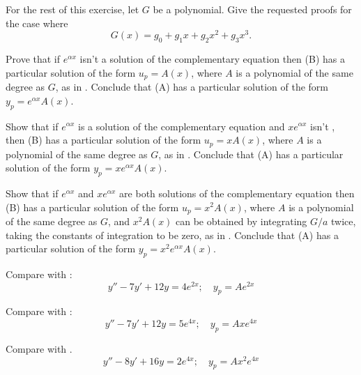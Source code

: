 \begin{exerciselist}
\begin{alist}
For the rest of this exercise, let $G$ be
 a polynomial. Give the requested proofs for the case where
\[
G(x)=g_0+g_1x+g_2x^2+g_3x^3.
\]

\item %
Prove that if $e^{\alpha x}$ isn't  a solution of the complementary
equation then (B) has a particular solution of the
form $u_p=A(x)$, where $A$ is a polynomial of the same degree as $G$,
as in . Conclude that (A) has
a particular solution of the form $y_p=e^{\alpha x}A(x)$.

\item %
Show that if $e^{\alpha x}$ is a solution of the complementary
equation and $xe^{\alpha x}$ isn't , then (B) has a
particular solution of the form $u_p=xA(x)$, where $A$ is a polynomial
of the same degree as $G$, as in . Conclude
that (A) has a particular solution of the form
$y_p=xe^{\alpha x}A(x)$.

\item %
Show that if $e^{\alpha x}$ and $xe^{\alpha x}$ are both solutions of
the complementary equation then (B) has a
particular solution of the form $u_p=x^2A(x)$, where $A$ is a
polynomial of the same degree as $G$, and $x^2A(x)$ can be obtained by
integrating $G/a$ twice, taking the constants of integration to be
zero, as in . Conclude that
(A) has a particular solution of the form
$y_p=x^2e^{\alpha x}A(x)$.
\end{alist}


\item\label{exer:5.4.31}Compare with :
\[
y''-7y'+12y=4e^{2x};\quad y_p=Ae^{2x}
\]

\item\label{exer:5.4.32}Compare with :
\[
y''-7y'+12y=5e^{4x};\quad y_p=Axe^{4x}
\]

\item\label{exer:5.4.33}Compare with .
\[
y''-8y'+16y=2e^{4x};\quad y_p=Ax^2e^{4x}
\]


\end{exerciselist}
